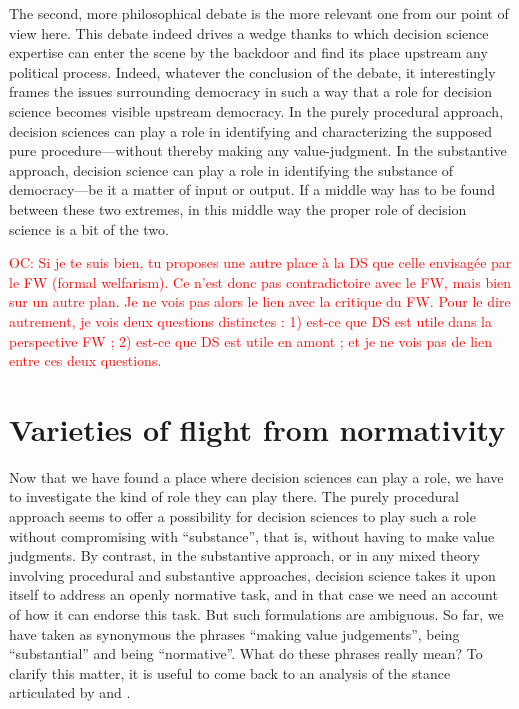 \documentclass[preprint,11pt]{elsarticle}
\newcommand{\commentOC}[1]{\textcolor{red}{OC: #1}}
\begin{document}
The second, more philosophical debate is the more relevant one from our point of view here. This debate indeed drives a wedge thanks to which decision science expertise can enter the scene by the backdoor and find its place upstream any political process. Indeed, whatever the conclusion of the debate, it interestingly frames the issues surrounding democracy in such a way that a role for decision science becomes visible upstream democracy. In the purely procedural approach, decision sciences can play a role in identifying and characterizing the supposed pure procedure—without thereby making any value-judgment. In the substantive approach, decision science can play a role in identifying the substance of democracy—be it a matter of input or output. If a middle way has to be found between these two extremes, in this middle way the proper role of decision science is a bit of the two.

\commentOC{Si je te suis bien, tu proposes une
autre place à la DS que celle envisagée par le FW (formal
welfarism). Ce n’est donc pas contradictoire avec le FW, mais
bien sur un autre plan. Je ne vois pas alors le lien avec la
critique du FW.
Pour le dire autrement, je vois deux questions distinctes : 1)
est-ce que DS est utile dans la perspective FW ; 2) est-ce que
DS est utile en amont ; et je ne vois pas de lien entre ces
deux questions.}

\section{Varieties of flight from normativity}
Now that we have found a place where decision sciences can play a role, we have to investigate the kind of role they can play there. The purely procedural approach seems to offer a possibility for decision sciences to play such a role without compromising with “substance”, that is, without having to make value judgments. By contrast, in the substantive approach, or in any mixed theory involving procedural and substantive approaches, decision science takes it upon itself to address an openly normative task, and in that case we need an account of how it can endorse this task.
But such formulations are ambiguous. So far, we have taken as synonymous the phrases “making value judgements”, being “substantial” and being “normative”. What do these phrases really mean? To clarify this matter, it is useful to come back to an analysis of the stance articulated by \cite{rawls_political_2005} and \cite{habermas_moralbewustsein_1983}.
\end{document}
